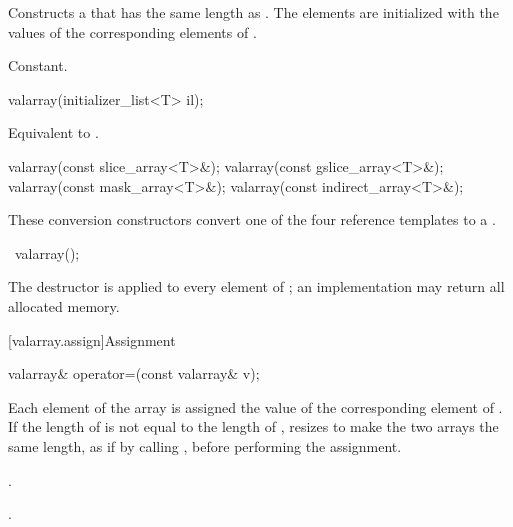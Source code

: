 \begin{itemdescr}
\pnum
\effects
Constructs a  that has the same length as .
The elements are initialized with the values of the corresponding
elements of .

\pnum
\complexity
Constant.
\end{itemdescr}

%
\begin{itemdecl}
valarray(initializer_list<T> il);
\end{itemdecl}

\begin{itemdescr}
\pnum
\effects
Equivalent to .
\end{itemdescr}

%
\begin{itemdecl}
valarray(const slice_array<T>&);
valarray(const gslice_array<T>&);
valarray(const mask_array<T>&);
valarray(const indirect_array<T>&);
\end{itemdecl}

\begin{itemdescr}
\pnum
These conversion constructors convert one of the four reference templates
to a
.
\end{itemdescr}

%
\begin{itemdecl}
~valarray();
\end{itemdecl}

\begin{itemdescr}
\pnum
\effects
The destructor is applied to every element of
;
an implementation may return all allocated memory.
\end{itemdescr}

[valarray.assign]{Assignment}

%
\begin{itemdecl}
valarray& operator=(const valarray& v);
\end{itemdecl}

\begin{itemdescr}
\pnum
\effects
Each element of the
array is assigned the value of the corresponding element of .
If the length of  is not equal to the length of ,
resizes  to make the two arrays the same length,
as if by calling , before performing the assignment.

\pnum
\ensures
{}.

\pnum
\returns
{}.
\end{itemdescr}

